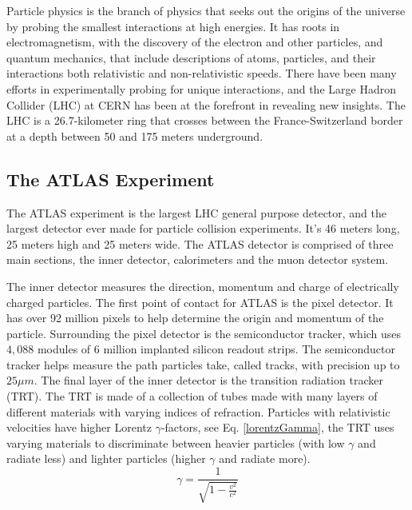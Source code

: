 Particle physics is the branch of physics that seeks out the origins of the universe by probing the smallest interactions at high energies.
It has roots in electromagnetism, with the discovery of the electron and other particles, and quantum mechanics, that include descriptions of atoms, particles, and their interactions both relativistic and non-relativistic speeds. 
There have been many efforts in experimentally probing for unique interactions, and the Large Hadron Collider (LHC) at CERN has been at the forefront in revealing new insights.  
The LHC is a 26.7-kilometer ring that crosses between the France-Switzerland border at a depth between 50 and 175 meters underground.\cite{LHC_faq_guide}


\subsection{The ATLAS Experiment}

The ATLAS experiment is the largest LHC general purpose detector, and the largest detector ever made for particle collision experiments. 
It's 46 meters long, 25 meters high and 25 meters wide.\cite{ATLAS_Fact_Sheet}
The ATLAS detector is comprised of three main sections, the inner detector, calorimeters and the muon detector system. 

The inner detector measures the direction, momentum and charge of electrically charged particles.
The first point of contact for ATLAS is the pixel detector. It has over 92 million pixels to help determine the origin and momentum of the particle.
Surrounding the pixel detector is the semiconductor tracker, which uses $4,088$ modules of 6 million implanted silicon readout strips.
The semiconductor tracker helps measure the path particles take, called tracks, with precision up to $25\mu m$. 
The final layer of the inner detector is the transition radiation tracker (TRT). 
The TRT is made of a collection of tubes made with many layers of different materials with varying indices of refraction.  
Particles with relativistic velocities have higher Lorentz $\gamma$-factors, see Eq. \eqref{lorentzGamma}, the TRT uses varying materials to discriminate between heavier particles (with low $\gamma$ and radiate less) and lighter particles (higher $\gamma$ and radiate more). \cite{Mindur:2139567}
\begin{equation}\label{lorentzGamma}
    \gamma = \frac{1}{\sqrt{1 - \frac{v^2}{c^2}}}
\end{equation}

